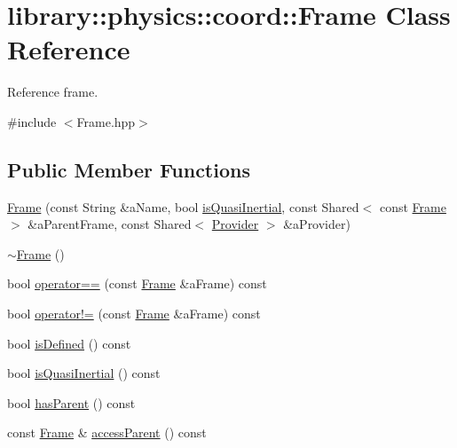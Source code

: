 \hypertarget{classlibrary_1_1physics_1_1coord_1_1_frame}{}\section{library\+:\+:physics\+:\+:coord\+:\+:Frame Class Reference}
\label{classlibrary_1_1physics_1_1coord_1_1_frame}


Reference frame.  




{\ttfamily \#include $<$Frame.\+hpp$>$}

\subsection*{Public Member Functions}
\begin{DoxyCompactItemize}
\item 
\hyperlink{classlibrary_1_1physics_1_1coord_1_1_frame_a53c1f8884a118492a3b024317c0ae0fd}{Frame} (const String \&a\+Name, bool \hyperlink{classlibrary_1_1physics_1_1coord_1_1_frame_a894d1ac6152e28dbb749058ca6ffd663}{is\+Quasi\+Inertial}, const Shared$<$ const \hyperlink{classlibrary_1_1physics_1_1coord_1_1_frame}{Frame} $>$ \&a\+Parent\+Frame, const Shared$<$ \hyperlink{classlibrary_1_1physics_1_1coord_1_1frame_1_1_provider}{Provider} $>$ \&a\+Provider)
\item 
\hyperlink{classlibrary_1_1physics_1_1coord_1_1_frame_a7a4b031eff12e290c0ccacb7d5a47dfd}{$\sim$\+Frame} ()
\item 
bool \hyperlink{classlibrary_1_1physics_1_1coord_1_1_frame_a19c5c4ce3b1669a774980d9c3f18fe6c}{operator==} (const \hyperlink{classlibrary_1_1physics_1_1coord_1_1_frame}{Frame} \&a\+Frame) const
\item 
bool \hyperlink{classlibrary_1_1physics_1_1coord_1_1_frame_a2b3b046c3779b4281f14601302446169}{operator!=} (const \hyperlink{classlibrary_1_1physics_1_1coord_1_1_frame}{Frame} \&a\+Frame) const
\item 
bool \hyperlink{classlibrary_1_1physics_1_1coord_1_1_frame_ad5a450dd6740fc5a27473e661375dde6}{is\+Defined} () const
\item 
bool \hyperlink{classlibrary_1_1physics_1_1coord_1_1_frame_a894d1ac6152e28dbb749058ca6ffd663}{is\+Quasi\+Inertial} () const
\item 
bool \hyperlink{classlibrary_1_1physics_1_1coord_1_1_frame_afd83dec4bf4e2aabc2b31019b282965e}{has\+Parent} () const
\item 
const \hyperlink{classlibrary_1_1physics_1_1coord_1_1_frame}{Frame} \& \hyperlink{classlibrary_1_1physics_1_1coord_1_1_frame_aaa33dd0c2af00aee0ffb4278cccdc8a2}{access\+Parent} () const

\end{DoxyCompactItemize}
